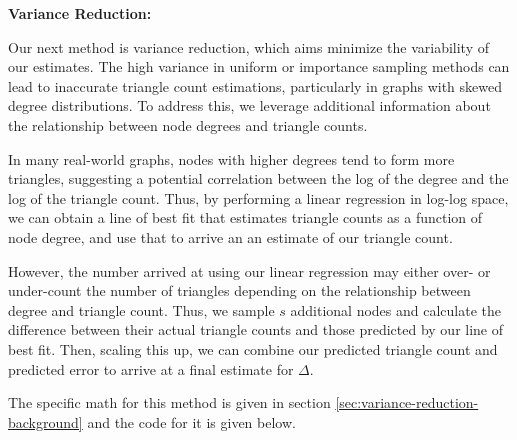 \documentclass[11pt]{article}
\begin{document}
\textbf{Variance Reduction:}

Our next method is variance reduction, which aims minimize the variability of our estimates.
The high variance in uniform or importance sampling methods can lead to inaccurate triangle count estimations, particularly in graphs with skewed degree distributions.
To address this, we leverage additional information about the relationship between node degrees and triangle counts.

In many real-world graphs, nodes with higher degrees tend to form more triangles, suggesting a potential correlation between the log of the degree and the log of the triangle count.
Thus, by performing a linear regression in log-log space, we can obtain a line of best fit that estimates triangle counts as a function of node degree, and use that to arrive an an estimate of our triangle count.

However, the number arrived at using our linear regression may either over- or under-count the number of triangles depending on the relationship between degree and triangle count.
Thus, we sample $s$ additional nodes and calculate the difference between their actual triangle counts and those predicted by our line of best fit.
Then, scaling this up, we can combine our predicted triangle count and predicted error to arrive at a final estimate for $\Delta$.

The specific math for this method is given in section \ref{sec:variance-reduction-background} and the code for it is given below.
\end{document}
